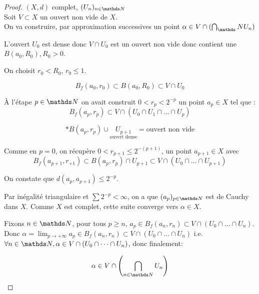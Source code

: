 \begin{proof}
  $(X,d)$ complet, $(U_n)_{n\in\NN}$\\
  Soit $V\subset X$ un ouvert non vide de $X$.\\
  On va construire, par approximation successives un point $\alpha\in V\cap(\bigcap_\NN U_n)$
  
  L'ouvert $U_0$ est dense donc $V\cap U_0$ est un ouvert non vide donc contient une $B(a_0, R_0), R_0>0$.

  On choisit $r_0 < R_0$, $r_9 \leq 1$.

  $$B_f(a_0, r_0)\subset B(a_0, R_0)\subset V\cap U_0$$

  \`A l'étape $p\in\NN$ on avait construit $0<r_p<2^{-p}$ un point $a_p\in X$ tel que :
  \[B_f(a_p, r_p) \subset V\cap (U_0\cap U_1 \cap \dots \cap U_p) \]

  \[\ast B(a_p, r_p)\cup \underset{\text{ouvert dense}}{U_{p+1}} = \text{ouvert non vide} \]

  Comme en $p=0$, on récupère $0<r_{p+1}\leq 2^{-(p+1)}$, un point $a_{p+1}\in X$ avec
  \[B_f(a_{p+1}, r_{+1}) \subset B(a_p, r_p)\cap U_{p+1} \subset V\cap (U_0\cap \dots \cap U_{p+1})\]

  On constate que $d(a_p, a_{p+1})\leq 2^{-p}$.

  Par inégalité triangulaire et $\sum 2^{-p} < \infty$, on a que $(a_p)_{p\in\NN}$ est de Cauchy dans $X$. Comme $X$ est complet, cette suite converge vers $\alpha \in X$.

  Fixons $n\in\NN$, pour tous $p\geq n$, $a_p\in B_f(a_n, r_n)\subset V\cap(U_0\cap \dots \cap U_n)$. Donc $\alpha = \lim_{p\to+\infty} a_p \in B_f(a_n, r_n) \subset V \cap (U_0\cap \dots \cap U_n)$ i.e. $\forall n\in \NN, \alpha \in V \cap (U_0 \cap \dots \cap U_n)$, donc finalement:

  \[\alpha \in V \cap \parenthesis{\bigcap_{n\in\NN}U_n}\]
\end{proof}
